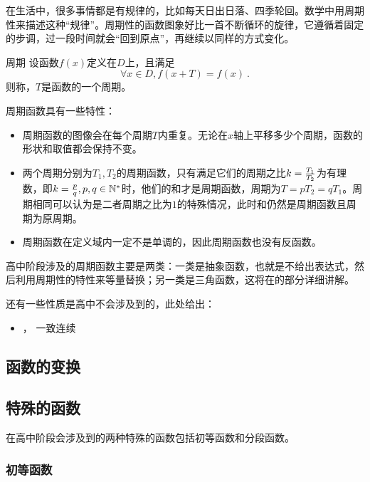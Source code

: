 在生活中，很多事情都是有规律的，比如每天日出日落、四季轮回。数学中用周期性来描述这种“规律”。周期性的函数图象好比一首不断循环的旋律，它遵循着固定的步调，过一段时间就会“回到原点”，再继续以同样的方式变化。

\begin{definition}{周期}
设函数$f(x)$定义在$D$上，且满足
\begin{equation}
\forall x\in D,f(x+T)=f(x)~.
\end{equation}
则称，$T$是函数的一个周期。
\end{definition}


周期函数具有一些特性：
\begin{itemize}
\item 周期函数的图像会在每个周期$T$内重复。无论在$x$轴上平移多少个周期，函数的形状和取值都会保持不变。
\item 两个周期分别为$T_1,T_2$的周期函数，只有满足它们的周期之比$k={T_1\over T_2}$为有理数，即$k={p\over q},p,q\in\mathbb{N}^*$时，他们的和才是周期函数，周期为$T=pT_2=qT_1$。周期相同可以认为是二者周期之比为$1$的特殊情况，此时和仍然是周期函数且周期为原周期。
\item 周期函数在定义域内一定不是单调的，因此周期函数也没有反函数。
\end{itemize}

高中阶段涉及的周期函数主要是两类：一类是抽象函数，也就是不给出表达式，然后利用周期性的特性来等量替换；另一类是三角函数，这将在的部分详细讲解。



还有一些性质是高中不会涉及到的，此处给出：
\begin{itemize}
\item {}， 一致连续
\end{itemize}

\subsection{函数的变换}\label{sub_HsFunC_2}



\subsection{特殊的函数}

在高中阶段会涉及到的两种特殊的函数包括初等函数和分段函数。

\subsubsection{初等函数}

